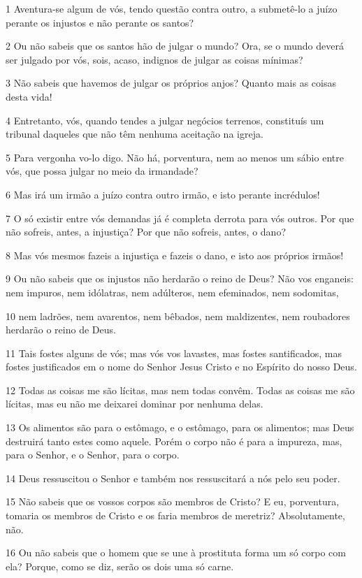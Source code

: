 \par 1 Aventura-se algum de vós, tendo questão contra outro, a submetê-lo a juízo perante os injustos e não perante os santos?
\par 2 Ou não sabeis que os santos hão de julgar o mundo? Ora, se o mundo deverá ser julgado por vós, sois, acaso, indignos de julgar as coisas mínimas?
\par 3 Não sabeis que havemos de julgar os próprios anjos? Quanto mais as coisas desta vida!
\par 4 Entretanto, vós, quando tendes a julgar negócios terrenos, constituís um tribunal daqueles que não têm nenhuma aceitação na igreja.
\par 5 Para vergonha vo-lo digo. Não há, porventura, nem ao menos um sábio entre vós, que possa julgar no meio da irmandade?
\par 6 Mas irá um irmão a juízo contra outro irmão, e isto perante incrédulos!
\par 7 O só existir entre vós demandas já é completa derrota para vós outros. Por que não sofreis, antes, a injustiça? Por que não sofreis, antes, o dano?
\par 8 Mas vós mesmos fazeis a injustiça e fazeis o dano, e isto aos próprios irmãos!
\par 9 Ou não sabeis que os injustos não herdarão o reino de Deus? Não vos enganeis: nem impuros, nem idólatras, nem adúlteros, nem efeminados, nem sodomitas,
\par 10 nem ladrões, nem avarentos, nem bêbados, nem maldizentes, nem roubadores herdarão o reino de Deus.
\par 11 Tais fostes alguns de vós; mas vós vos lavastes, mas fostes santificados, mas fostes justificados em o nome do Senhor Jesus Cristo e no Espírito do nosso Deus.
\par 12 Todas as coisas me são lícitas, mas nem todas convêm. Todas as coisas me são lícitas, mas eu não me deixarei dominar por nenhuma delas.
\par 13 Os alimentos são para o estômago, e o estômago, para os alimentos; mas Deus destruirá tanto estes como aquele. Porém o corpo não é para a impureza, mas, para o Senhor, e o Senhor, para o corpo.
\par 14 Deus ressuscitou o Senhor e também nos ressuscitará a nós pelo seu poder.
\par 15 Não sabeis que os vossos corpos são membros de Cristo? E eu, porventura, tomaria os membros de Cristo e os faria membros de meretriz? Absolutamente, não.
\par 16 Ou não sabeis que o homem que se une à prostituta forma um só corpo com ela? Porque, como se diz, serão os dois uma só carne.
